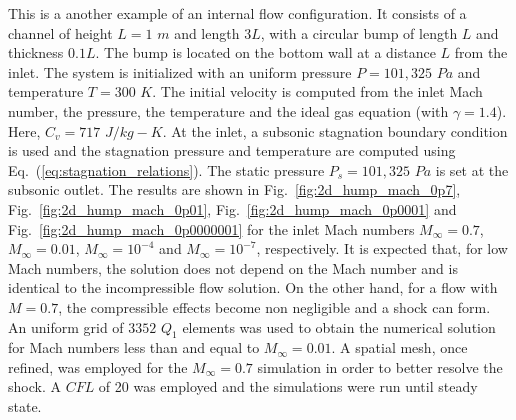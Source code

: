 \documentclass[review,10pt]{elsarticle}
\newcommand{\eqt}[1]{Eq.~(\ref{#1})}                     %
\newcommand{\fig}[1]{Fig.~\ref{#1}}                      %
\begin{document}
This is a another example of an internal flow configuration. It consists of a channel of height $L=1$ $m$ 
and length $3L$, with a circular bump of length $L$ and thickness $0.1L$. The bump is located on the bottom 
wall at a distance $L$ from the inlet. The system is initialized with an uniform pressure $P=101,325$ $Pa$ 
and temperature $T=300$ $K$. The initial velocity is computed from the inlet Mach number, the pressure, the 
temperature and the ideal gas equation (with  $\gamma=1.4$). Here,  $C_v = 717$ $J/kg-K$. At the inlet, a 
subsonic stagnation boundary condition is used and the stagnation pressure and temperature are computed 
using \eqt{eq:stagnation_relations}.
The static pressure $P_s = 101,325$ $Pa$ is set at the subsonic outlet. The results are shown in \fig{fig:2d_hump_mach_0p7}, 
\fig{fig:2d_hump_mach_0p01}, \fig{fig:2d_hump_mach_0p0001} and \fig{fig:2d_hump_mach_0p0000001} for the inlet 
Mach numbers $M_{\infty}=0.7$, $M_{\infty}=0.01$, $M_{\infty}=10^{-4}$ and $M_{\infty}=10^{-7}$, respectively. 
It is expected that, for low Mach numbers, the solution does not depend on the Mach number and is 
identical to the incompressible flow solution. On the other hand, for a flow with $M=0.7$, 
the compressible effects become non negligible and a shock can form. An uniform grid of $3352$ $Q_1$ elements 
was used to obtain the numerical solution for Mach numbers less than and equal to $M_{\infty}=0.01$. A spatial mesh, once refined, was 
employed for the $M_{\infty}=0.7$ simulation in order to better resolve the shock. A $CFL$ of 20 was employed 
and the simulations were run until steady state.
%
\end{document}
